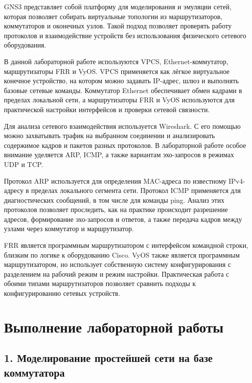 \documentclass[
  english,
  russian,
  12pt,
  a4paper,
  DIV=11,
  numbers=noendperiod]{scrreprt}
\begin{document}
GNS3 представляет собой платформу для моделирования и эмуляции сетей,
которая позволяет собирать виртуальные топологии из маршрутизаторов,
коммутаторов и оконечных узлов. Такой подход позволяет проверять работу
протоколов и взаимодействие устройств без использования физического
сетевого оборудования.

В данной лабораторной работе используются VPCS, Ethernet-коммутатор,
маршрутизаторы FRR и VyOS. VPCS применяется как лёгкое виртуальное
конечное устройство, на котором можно задавать IP-адрес, шлюз и
выполнять базовые сетевые команды. Коммутатор Ethernet обеспечивает
обмен кадрами в пределах локальной сети, а маршрутизаторы FRR и VyOS
используются для практической настройки интерфейсов и проверки сетевой
связности.

Для анализа сетевого взаимодействия используется Wireshark. С его
помощью можно захватывать трафик на выбранном соединении и анализировать
содержимое кадров и пакетов разных протоколов. В лабораторной работе
особое внимание уделяется ARP, ICMP, а также вариантам эхо-запросов в
режимах UDP и TCP.

Протокол ARP используется для определения MAC-адреса по известному
IPv4-адресу в пределах локального сегмента сети. Протокол ICMP
применяется для диагностических сообщений, в том числе для команды ping.
Анализ этих протоколов позволяет проследить, как на практике происходит
разрешение адресов, формирование эхо-запросов и ответов, а также
передача кадров между узлами через коммутатор и маршрутизатор.

FRR является программным маршрутизатором с интерфейсом командной строки,
близким по логике к оборудованию Cisco. VyOS также является программным
маршрутизатором, но использует собственную систему конфигурирования с
разделением на рабочий режим и режим настройки. Практическая работа с
обоими типами маршрутизаторов позволяет сравнить подходы к
конфигурированию сетевых устройств.

\chapter{Выполнение лабораторной
работы}\label{ux432ux44bux43fux43eux43bux43dux435ux43dux438ux435-ux43bux430ux431ux43eux440ux430ux442ux43eux440ux43dux43eux439-ux440ux430ux431ux43eux442ux44b}

\section{1. Моделирование простейшей сети на базе
коммутатора}\label{ux43cux43eux434ux435ux43bux438ux440ux43eux432ux430ux43dux438ux435-ux43fux440ux43eux441ux442ux435ux439ux448ux435ux439-ux441ux435ux442ux438-ux43dux430-ux431ux430ux437ux435-ux43aux43eux43cux43cux443ux442ux430ux442ux43eux440ux430}
\end{document}
